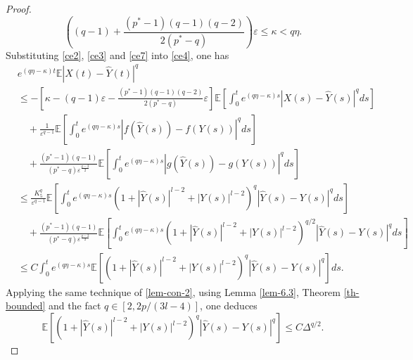 \documentclass[preprint,12pt,compress]{elsarticle}
\begin{document}
\begin{proof}
\begin{equation}
	\left( {(q - 1) + \frac{{({p^*} - 1)(q - 1)(q - 2)}}{{2({p^*} - q)}}} \right)\varepsilon  \le \kappa  < q\eta .
\end{equation}
Substituting \eqref{ce2}, \eqref{ce3} and \eqref{ce7} into \eqref{ce4}, one has
\begin{equation}  \label{ce1}
\begin{split}
	&{e^{\left( {q\eta  - \kappa } \right)t}}\mathbb{E}{\left| {X(t) -  \hat Y(t)} \right|^q} \\
	&\le  - \left[ {\kappa  - (q - 1)\varepsilon  - \frac{{({p^*} - 1)(q - 1)(q - 2)}}{{2({p^*} - q)}}\varepsilon } \right]\mathbb{E}\left[ {\int_0^t {{e^{\left( {q\eta  - \kappa } \right)s}}{{\left| {X(s) - \hat Y(s)} \right|}^q}ds} } \right]  \\
	&\quad+ \frac{1}{{{\varepsilon ^{q - 1}}}}\mathbb{E}\left[ {\int_0^t {{e^{\left( {q\eta  - \kappa } \right)s}}{{\left| {f(\hat Y(s)) - f(Y(s))} \right|}^q}ds} } \right] \\
	&\quad+ \frac{{({p^*} - 1)(q - 1)}}{{({p^*} - q){\varepsilon ^{\frac{{q - 2}}{2}}}}}\mathbb{E}\left[ {\int_0^t {{e^{\left( {q\eta  - \kappa } \right)s}}{{\left| {g(\hat Y(s)) - g(Y(s))} \right|}^q}ds} } \right] \\
	&\le \frac{K_5^q}{{{\varepsilon ^{q - 1}}}}\mathbb{E}\left[ {\int_0^t {{e^{\left( {q\eta  - \kappa } \right)s}}{{\left( {1 + {{\left| {\hat Y(s)} \right|}^{l-2}} + {{\left| {Y(s)} \right|}^{l-2}}} \right)}^q}{{\left| {\hat Y(s) - Y(s)} \right|}^q}ds} } \right]  \\
	&\quad+ \frac{{({p^*} - 1)(q - 1)}}{{({p^*} - q){\varepsilon ^{\frac{{q - 2}}{2}}}}}\mathbb{E}\left[ {\int_0^t {{e^{\left( {q\eta  - \kappa } \right)s}}{{\left( {1 + {{\left| {\hat Y(s)} \right|}^{l-2}} + {{\left| {Y(s)} \right|}^{l-2}}} \right)}^{{q}/{2}}}{{\left| {\hat Y(s) - Y(s)} \right|}^q}ds} } \right] \\
	&\le C\int_0^t {{e^{\left( {q\eta  - \kappa } \right)s}}\mathbb{E}\left[ {{{\left( {1 + {{\left| {\hat Y(s)} \right|}^{l-2}} + {{\left| {Y(s)} \right|}^{l-2}}} \right)}^q}{{\left| { \hat Y(s) - Y(s)} \right|}^q}} \right]ds} .
\end{split}
\end{equation}
Applying the same technique of \eqref{lem-con-2}, using Lemma \ref{lem-6.3}, Theorem \ref{th-bounded} and the fact $q \in \left[ {2,2p/(3l - 4)} \right]$, one deduces
\begin{equation}  \label{ce6}
	\mathbb{E}\left[ {{{\left( {1 + {{\left| {\hat Y(s)} \right|}^{l-2}} + {{\left| {Y(s)} \right|}^{l-2}}} \right)}^q}{{\left| { \hat Y(s) - Y(s)} \right|}^q}} \right]  \le {C}\Delta^{{q}/{2}} . 

\end{equation}
\end{proof}
\end{document}
